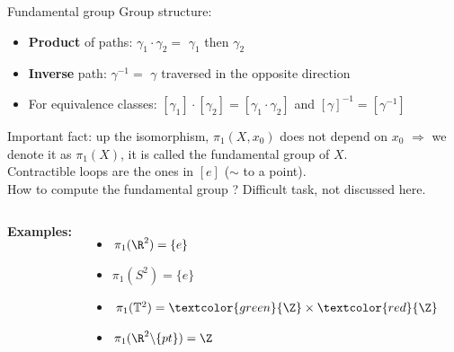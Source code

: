 \documentclass[10pt]{beamer}
\renewcommand{\emph}{\alert}
\begin{document}
\begin{frame}{Fundamental group}
    Group structure:
    \begin{itemize}
      \item \textbf{Product} of paths: $\gamma_1\cdot\gamma_2=$ $\gamma_1$ then $\gamma_2$ 
      \item \textbf{Inverse} path: $\gamma^{-1}=$ $\gamma$ traversed in the opposite direction
      \item For equivalence classes: $[\gamma_1]\cdot[\gamma_2]=[\gamma_1\cdot\gamma_2]$ and $[\gamma]^{-1}=[\gamma^{-1}]$
    \end{itemize}
    Important fact: up the isomorphism, $\pi_1(X,x_0)$ does not depend on $x_0$ $\Rightarrow$ we denote it as $\pi_1(X)$, it is called the \emph{fundamental group} of $X$.\\[0.2cm]
    
    Contractible loops are the ones in $[e]$ ($\sim$ to a point).\\[0.2cm]

    How to compute the fundamental group ? Difficult task, not discussed here.\\[0.2cm]

    \begin{columns}[T,onlytextwidth]
        
        \textbf{Examples:}
        \begin{itemize}
          \item $\pi_1(\R^2)=\{e\}$
          \item $\pi_1(S^2) = \{e\}$
          \item $\pi_1(\mathbb{T}^2)=\textcolor{green}{\Z}\times\textcolor{red}{\Z}$
          \item $\pi_1(\R^2\backslash\{pt\})=\Z$
        \end{itemize}
  
  
        \begin{figure}
          \centering
          \includegraphics[scale=0.2]{Pictures/torushomotopy3.png}
        \end{figure}
  
    \end{columns}

\end{frame}
\end{document}
